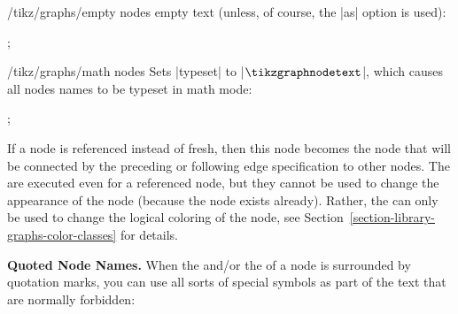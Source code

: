 \begin{itemize}
\begin{key}{/tikz/graphs/empty nodes}
    empty text (unless, of course, the |as| option is used):
    \begin{codeexample}[]
\tikz {};  
    \end{codeexample}
  \end{key}
  \begin{key}{/tikz/graphs/math nodes}
    Sets |typeset| to |$\tikzgraphnodetext$|, which causes all nodes
    names to be typeset in math mode:
    \begin{codeexample}[]
\tikz {};  
    \end{codeexample}
  \end{key}
\end{itemize}

If a node is referenced instead of fresh, then this node becomes the
node that will be connected by the preceding or following edge
specification to other 
nodes. The  are executed even for a referenced node, but
they cannot be used to change the appearance of the node (because the
node exists already). Rather, the  can only be used to
change the logical coloring of the node, see
Section~\ref{section-library-graphs-color-classes} for details.

\medskip
\textbf{Quoted Node Names.} When the  and/or the
 of a node is surrounded by quotation marks, you can use
all sorts of special symbols as part of the text that are
normally forbidden:
\begin{codeexample}[]
\end{codeexample}

